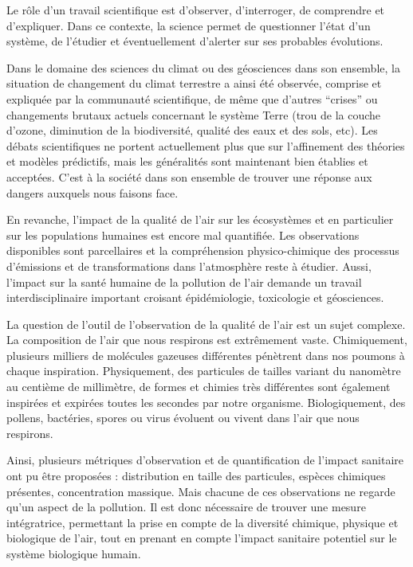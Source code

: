 Le rôle d'un travail scientifique est d'observer, d'interroger, de comprendre et d'expliquer. 
Dans ce contexte, la science permet de questionner l'état d'un système, de l'étudier et
éventuellement d'alerter sur ses probables évolutions.

Dans le domaine des sciences du climat ou des géosciences dans son ensemble, la situation
de changement du climat terrestre a ainsi été observée, comprise et expliquée
par la communauté scientifique, de même que d'autres ``crises'' ou changements brutaux
actuels concernant le système Terre (trou de la couche d'ozone, diminution de la
biodiversité, qualité des eaux et des sols, etc).
Les débats scientifiques ne portent actuellement plus que sur l'affinement des théories et
modèles prédictifs, mais les généralités sont maintenant bien établies et acceptées. C'est
à la société dans son ensemble de trouver une réponse aux dangers auxquels nous faisons
face.

En revanche, l'impact de la qualité de l'air sur les écosystèmes et en particulier sur les
populations humaines est encore mal quantifiée. Les observations disponibles sont
parcellaires et la compréhension physico-chimique des processus d'émissions et de
transformations dans l'atmosphère reste à étudier. Aussi, l'impact sur la santé
humaine de la pollution de l'air demande un travail interdisciplinaire important croisant
épidémiologie, toxicologie et géosciences.

La question de l'outil de l'observation de la qualité de l'air est un sujet complexe. La
composition de l'air que nous respirons est extrêmement vaste. Chimiquement, plusieurs
milliers de molécules gazeuses différentes pénètrent dans nos poumons à chaque inspiration.
Physiquement, des particules de tailles variant du nanomètre au centième de millimètre, de
formes et chimies très différentes sont également inspirées et expirées toutes les
secondes par notre organisme. Biologiquement, des pollens, bactéries, spores ou virus
évoluent ou vivent dans l'air que nous respirons.

Ainsi, plusieurs métriques d'observation et de quantification de l'impact sanitaire ont pu
être proposées : distribution en taille des particules, espèces chimiques présentes,
concentration massique.
Mais chacune de ces observations ne regarde qu'un aspect de la pollution. Il est donc
nécessaire de trouver une mesure intégratrice, permettant la prise en compte de la
diversité chimique, physique et biologique de l'air, tout en prenant en compte l'impact
sanitaire potentiel sur le système biologique humain.


